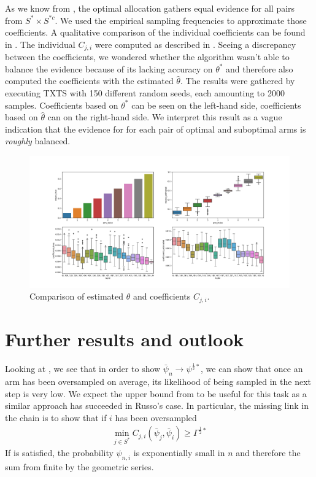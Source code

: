 As we know from , the optimal allocation
gathers equal evidence for all pairs from $S^* \times S^{*c}$. We used the
empirical sampling frequencies to approximate those coefficients. A qualitative
comparison of the individual coefficients can be found in
. The individual $C_{j, i}$ were computed as
described in . Seeing a discrepancy
between the coefficients, we wondered whether the algorithm wasn't able to
balance the evidence because of its lacking accuracy on $\theta^*$ and therefore
also computed the coefficients with the estimated $\hat{\theta}$. The results
were gathered by executing TXTS with 150 different random seeds, each amounting to 2000 samples. Coefficients based on $\theta^*$ can be seen on the left-hand side, coefficients based on $\hat{\theta}$ can on the right-hand side. We interpret this result as a vague indication that the evidence for for each pair of optimal and suboptimal arms is \emph{roughly} balanced.
\begin{figure}[h]
  \centering
  \includegraphics[width=\textwidth]{190909-coefficients_2000.png}
  \caption{Comparison of estimated $\theta$ and coefficients $C_{j, i}$.}
  \label{fig:algorithm_coefficients}
\end{figure}

\section{Further results and outlook}\label{section:further_results}

Looking at , we see that in
order to show $\bar{\psi}_n \rightarrow \psi^{\frac{1}{2}*}$, we can show that
once an arm has been oversampled on average, its likelihood of being sampled in
the next step is very low. We expect the upper bound from
 to be useful for this task as a similar approach has
succeeded in Russo's case. In particular, the missing link in the chain is to
show that if $i$ has been oversampled
\begin{align}
  \min_{j \in S^*} C_{j, i}(\bar{\psi}_j, \bar{\psi}_i) \geq
      \Gamma^{\frac{1}{2}*} \label{eq:missing_link}
\end{align}
If  is satisfied, the
probability $\psi_{n, i}$ is exponentially small in $n$ and therefore the sum
from  finite by the geometric
series.

